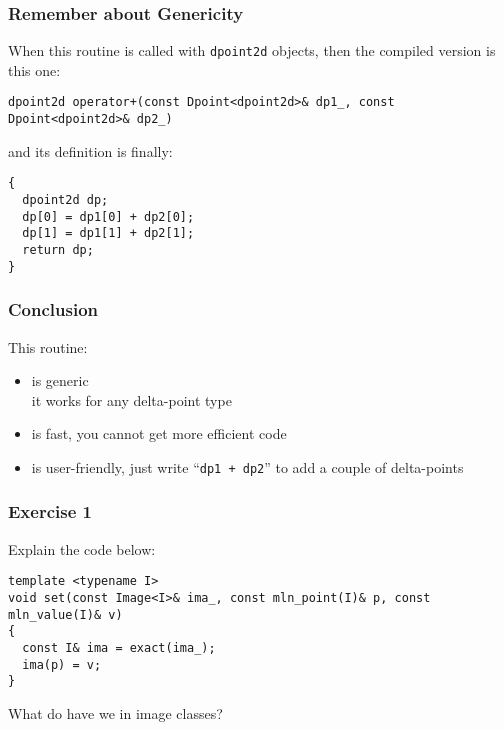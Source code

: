 \documentclass{beamer}
\newcommand{\code}[1]{{\scriptsize{\texttt{#1}}}\xspace}
\begin{document}
\begin{frame}[fragile]
  \frametitle{Remember about Genericity}

When this routine is called with \code{dpoint2d} objects, then
the compiled version is this one:

\begin{lstlisting}
dpoint2d operator+(const Dpoint<dpoint2d>& dp1_, const Dpoint<dpoint2d>& dp2_)
\end{lstlisting}

and its definition is finally:
\begin{lstlisting}
{
  dpoint2d dp;
  dp[0] = dp1[0] + dp2[0];
  dp[1] = dp1[1] + dp2[1];
  return dp;
}
\end{lstlisting}

\end{frame}



\begin{frame}
  \frametitle{Conclusion}

This routine:
  \smallskip

\begin{itemize}
\item is generic\\
  \scriptsize{it works for any delta-point type}
  \smallskip
\item is fast,
  \scriptsize{you cannot get more efficient code}
  \smallskip
\item is user-friendly,
  \scriptsize{just write ``\code{dp1 + dp2}'' to add a couple of delta-points}
\end{itemize}

\end{frame}



\begin{frame}[fragile]
  \frametitle{Exercise 1}

Explain the code below:

\begin{lstlisting}
template <typename I>
void set(const Image<I>& ima_, const mln_point(I)& p, const mln_value(I)& v)
{
  const I& ima = exact(ima_);
  ima(p) = v;
}
\end{lstlisting}

\smallskip

What do have we in image classes?

\end{frame}
\end{document}
